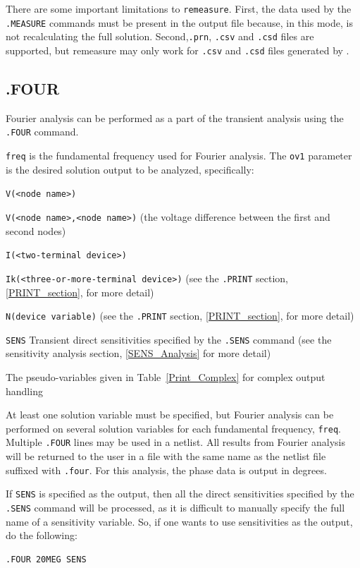 There are some important limitations to \texttt{remeasure}.  First, the data used by the
\texttt{.MEASURE} commands must be present in the output file because, in this
mode, \Xyce{} is not recalculating the full solution.  Second,\texttt{.prn}, 
\texttt{.csv} and \texttt{.csd} files are supported, but remeasure may only
work for \texttt{.csv} and \texttt{.csd} files generated by \Xyce{}.


\subsection{.FOUR}
Fourier analysis can be performed as a part of the transient analysis using
the \texttt{.FOUR} command.


\texttt{freq} is the fundamental frequency used for Fourier analysis.
The \texttt{ov1} parameter is the desired solution output to be analyzed, specifically:
\begin{XyceItemize}
\item \texttt{V(<node name>)}
\item \texttt{V(<node name>,<node name>)} (the voltage difference between the first and second nodes)
\item \texttt{I(<two-terminal device>)}
\item \texttt{Ik(<three-or-more-terminal device>)} (see the \texttt{.PRINT} section, \ref{PRINT_section}, for more detail)
\item \texttt{N(device variable)} (see the \texttt{.PRINT} section, \ref{PRINT_section}, for more detail)
\item \texttt{SENS} Transient direct sensitivities specified by the \texttt{.SENS} command  (see the sensitivity analysis section, \ref{SENS_Analysis} for more detail)
\item The pseudo-variables given in Table~\ref{Print_Complex} for complex output handling
\end{XyceItemize}
At least one solution variable must be specified, but
Fourier analysis can be performed on several solution variables for each 
fundamental frequency, \texttt{freq}.
Multiple \texttt{.FOUR} lines may be used in a netlist.  
All results from Fourier analysis will be returned to the user in a file 
with the same name as the netlist file suffixed with \texttt{.four}.
For this analysis, the phase data is output in degrees.

If \texttt{SENS} is specified as the output, then all the direct sensitivities 
specified by the \texttt{.SENS} command will be processed, as it is difficult to 
manually specify the full name of a sensitivity variable.  So, if one wants 
to use sensitivities as the output, do the following:
\begin{verbatim}
.FOUR 20MEG SENS
\end{verbatim}

